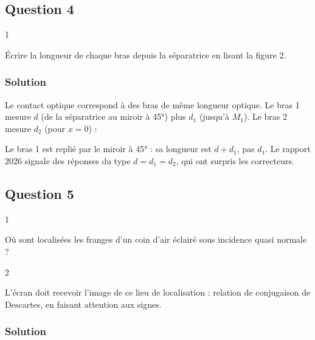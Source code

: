 \documentclass[11pt,a4paper]{article}
\newcommand{\equationajustee}[1]{%
  \sbox{\boiteequation}{$\displaystyle #1$}%
  \ifdim\wd\boiteequation>\linewidth
    \[\resizebox{\linewidth}{!}{\usebox{\boiteequation}}\]%
  \else
    \[#1\]%
  \fi}
\begin{document}
\hypertarget{question-4}{%
\subsection{Question 4}\label{question-4}}

\begin{indication}{1}

Écrire la longueur de chaque bras depuis la séparatrice en lisant la figure 2.

\end{indication}

\hypertarget{solution-3}{%
\subsubsection{Solution}\label{solution-3}}

Le contact optique correspond à des bras de même longueur optique. Le bras 1 mesure \(d\) (de la séparatrice au miroir à 45°) plus \(d_1\) (jusqu'à \(M_1\)). Le bras 2 mesure \(d_2\) (pour \(x=0\)) :
\equationajustee{\boxed{d+d_1=d_2}}

\begin{piege}

Le bras 1 est replié par le miroir à 45° : sa longueur est \(d+d_1\), pas \(d_1\). Le rapport 2026 signale des réponses du type \(d=d_1=d_2\), qui ont surpris les correcteurs.

\end{piege}

\hypertarget{question-5}{%
\subsection{Question 5}\label{question-5}}

\begin{indication}{1}

Où sont localisées les franges d'un coin d'air éclairé sous incidence quasi normale ?

\end{indication}

\begin{indication}{2}

L'écran doit recevoir l'image de ce lieu de localisation : relation de conjugaison de Descartes, en faisant attention aux signes.

\end{indication}

\hypertarget{solution-4}{%
\subsubsection{Solution}\label{solution-4}}
\end{document}
